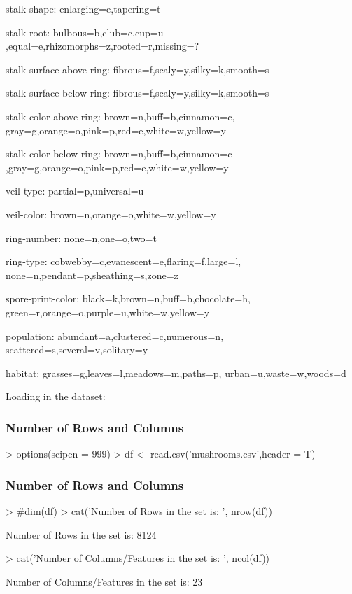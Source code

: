 \documentclass[10pt]{article}         %
\begin{document}
stalk-shape: enlarging=e,tapering=t

stalk-root: bulbous=b,club=c,cup=u
,equal=e,rhizomorphs=z,rooted=r,missing=?

stalk-surface-above-ring: fibrous=f,scaly=y,silky=k,smooth=s

stalk-surface-below-ring: fibrous=f,scaly=y,silky=k,smooth=s

stalk-color-above-ring: brown=n,buff=b,cinnamon=c,
gray=g,orange=o,pink=p,red=e,white=w,yellow=y

stalk-color-below-ring: brown=n,buff=b,cinnamon=c
,gray=g,orange=o,pink=p,red=e,white=w,yellow=y

veil-type: partial=p,universal=u

veil-color: brown=n,orange=o,white=w,yellow=y

ring-number: none=n,one=o,two=t

ring-type: cobwebby=c,evanescent=e,flaring=f,large=l,
none=n,pendant=p,sheathing=s,zone=z

spore-print-color: black=k,brown=n,buff=b,chocolate=h,
green=r,orange=o,purple=u,white=w,yellow=y

population: abundant=a,clustered=c,numerous=n,
scattered=s,several=v,solitary=y

habitat: grasses=g,leaves=l,meadows=m,paths=p,
urban=u,waste=w,woods=d


\pagebreak
Loading in the dataset:
\subsubsection{Number of Rows and Columns}
\begin{Schunk}
\begin{Sinput}
> options(scipen = 999)
> df <- read.csv('mushrooms.csv',header = T)
\end{Sinput}
\end{Schunk}

\subsubsection{Number of Rows and Columns}
\begin{Schunk}
\begin{Sinput}
> #dim(df)
> cat('Number of Rows in the set is: ', nrow(df))
\end{Sinput}
\begin{Soutput}
Number of Rows in the set is:  8124
\end{Soutput}
\begin{Sinput}
> cat('Number of Columns/Features in the set is: ', ncol(df))
\end{Sinput}
\begin{Soutput}
Number of Columns/Features in the set is:  23
\end{Soutput}
\end{Schunk}
\end{document}
